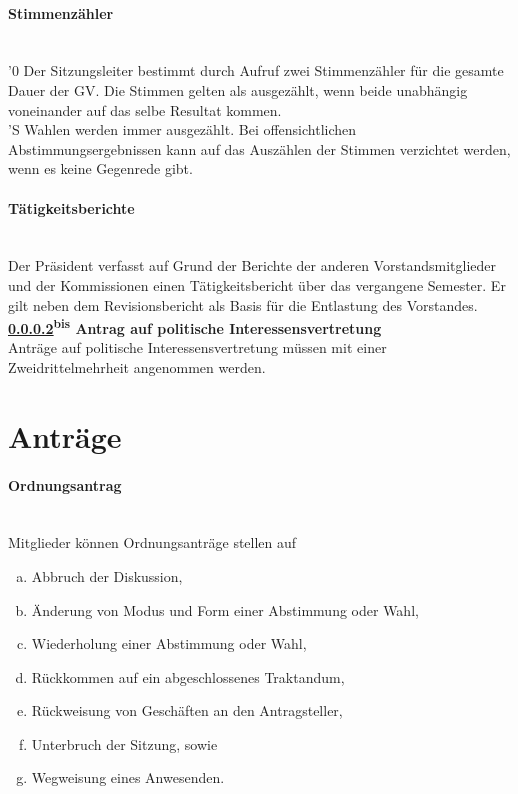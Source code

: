 \documentclass[a4paper,11pt]{article}
\newcommand{\nl}{\\[1.5ex]}
\begin{document}
\paragraph{Stimmenzähler} \ \\
'0 Der Sitzungsleiter bestimmt durch Aufruf zwei Stimmenzähler für die gesamte Dauer der GV. Die Stimmen gelten als ausgezählt, wenn beide unabhängig voneinander auf das selbe Resultat kommen. \nl
'S Wahlen werden immer ausgezählt. Bei offensichtlichen Abstimmungsergebnissen kann auf das Auszählen der Stimmen verzichtet werden, wenn es keine Gegenrede gibt.


\paragraph{Tätigkeitsberichte}\label{par:tatber} 
\ \\
Der Präsident verfasst auf Grund der Berichte der anderen Vorstandsmitglieder und der Kommissionen einen Tätigkeitsbericht über das vergangene Semester. Er gilt neben dem Revisionsbericht als Basis für die Entlastung des Vorstandes. \\

\textbf{\ref{par:tatber}\textsuperscript{bis} Antrag auf politische Interessensvertretung} \ \\
Anträge auf politische Interessensvertretung müssen mit einer Zweidrittelmehrheit angenommen werden.

\section*{Anträge}
\paragraph{Ordnungsantrag} \ \\
Mitglieder können Ordnungsanträge stellen auf
\begin{enumerate}[(a)]
  \item Abbruch der Diskussion,
  \item Änderung von Modus und Form einer Abstimmung oder Wahl,
  \item Wiederholung einer Abstimmung oder Wahl,
  \item Rückkommen auf ein abgeschlossenes Traktandum,
  \item Rückweisung von Geschäften an den Antragsteller,
  \item Unterbruch der Sitzung, sowie
  \item Wegweisung eines Anwesenden.
\end{enumerate}
\end{document}
